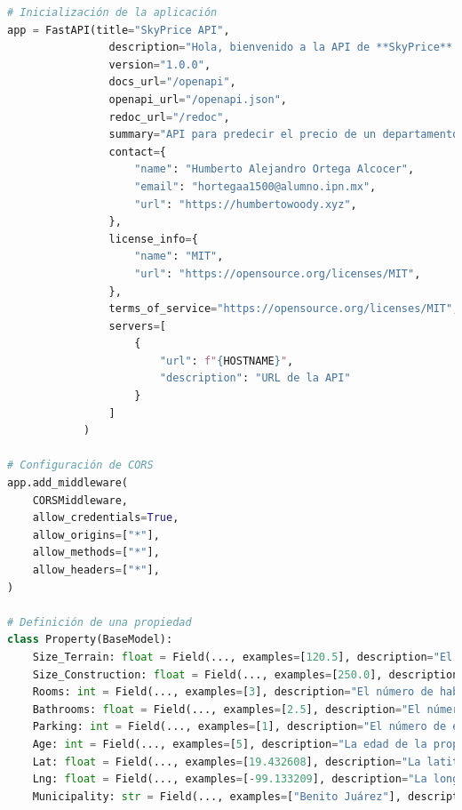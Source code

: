 \begin{lstlisting}[language=python, caption={API REST}, label={lst:api-rest}]
# Inicialización de la aplicación
app = FastAPI(title="SkyPrice API",
                description="Hola, bienvenido a la API de **SkyPrice**. Aquí puedes predecir el precio de una propiedad utilizando tres modelos de aprendizaje automático: Random Forest, SVM y Redes Neuronales. Para predecir el precio de una propiedad, envía una solicitud POST a la ruta /predict con los datos de la propiedad. También puedes obtener información sobre los modelos y sus características en la ruta /models. ¡Diviértete!",
                version="1.0.0",
                docs_url="/openapi",
                openapi_url="/openapi.json",
                redoc_url="/redoc",
                summary="API para predecir el precio de un departamento en la CDMX",
                contact={
                    "name": "Humberto Alejandro Ortega Alcocer",
                    "email": "hortegaa1500@alumno.ipn.mx",
                    "url": "https://humbertowoody.xyz",
                },
                license_info={
                    "name": "MIT",
                    "url": "https://opensource.org/licenses/MIT",
                },
                terms_of_service="https://opensource.org/licenses/MIT",
                servers=[
                    {
                        "url": f"{HOSTNAME}",
                        "description": "URL de la API"
                    }
                ]
            )

# Configuración de CORS
app.add_middleware(
    CORSMiddleware,
    allow_credentials=True,
    allow_origins=["*"],
    allow_methods=["*"],
    allow_headers=["*"],
)

# Definición de una propiedad
class Property(BaseModel):
    Size_Terrain: float = Field(..., examples=[120.5], description="El tamaño del terreno en metros cuadrados")
    Size_Construction: float = Field(..., examples=[250.0], description="El tamaño de la construcción en metros cuadrados")
    Rooms: int = Field(..., examples=[3], description="El número de habitaciones")
    Bathrooms: float = Field(..., examples=[2.5], description="El número de baños")
    Parking: int = Field(..., examples=[1], description="El número de espacios de estacionamiento disponibles")
    Age: int = Field(..., examples=[5], description="La edad de la propiedad en años")
    Lat: float = Field(..., examples=[19.432608], description="La latitud de la propiedad")
    Lng: float = Field(..., examples=[-99.133209], description="La longitud de la propiedad")
    Municipality: str = Field(..., examples=["Benito Juárez"], description="El municipio donde se encuentra la propiedad")


\end{lstlisting}
